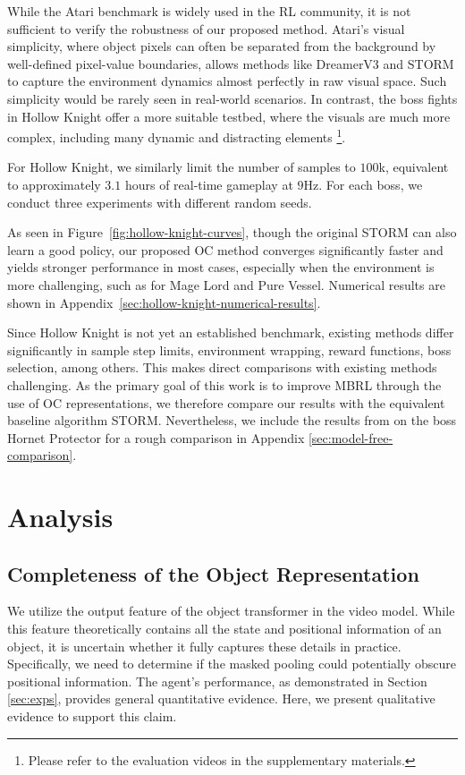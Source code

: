 \documentclass{article} %
\begin{document}
While the Atari benchmark is widely used in the RL community, it is not sufficient to verify the robustness of our proposed method.
Atari's visual simplicity, where object pixels can often be separated from the background by well-defined pixel-value boundaries, allows methods like DreamerV3 and STORM to capture the environment dynamics almost perfectly in raw visual space.
Such simplicity would be rarely seen in real-world scenarios.
In contrast, the boss fights in Hollow Knight offer a more suitable testbed, where the visuals are much more complex, including many dynamic and distracting elements \footnote{Please refer to the evaluation videos in the supplementary materials.}.

For Hollow Knight, we similarly limit the number of samples to $100$k, equivalent to approximately $3.1$ hours of real-time gameplay at $9$Hz. 
For each boss, we conduct three experiments with different random seeds.

As seen in Figure~\ref{fig:hollow-knight-curves}, though the original STORM can also learn a good policy, our proposed OC method converges significantly faster and yields stronger performance in most cases, especially when the environment is more challenging, such as for Mage Lord and Pure Vessel.
Numerical results are shown in Appendix~\ref{sec:hollow-knight-numerical-results}.

Since Hollow Knight is not yet an established benchmark, existing methods differ significantly in sample step limits, environment wrapping, reward functions, boss selection, among others.
This makes direct comparisons with existing methods challenging.
As the primary goal of this work is to improve MBRL through the use of OC representations, we therefore compare our results with the equivalent baseline algorithm STORM.
Nevertheless, we include the results from \citet{yang_seermerhollowknight_rl_2023} on the boss Hornet Protector for a rough comparison in Appendix \ref{sec:model-free-comparison}.


\section{Analysis} \label{sec:analysis}


\subsection{Completeness of the Object Representation} \label{sec:vector-decode-to-img}

We utilize the output feature of the object transformer in the video model. 
While this feature theoretically contains all the state and positional information of an object, it is uncertain whether it fully captures these details in practice. 
Specifically, we need to determine if the masked pooling could potentially obscure positional information.
The agent's performance, as demonstrated in Section \ref{sec:exps}, provides general quantitative evidence.
Here, we present qualitative evidence to support this claim.
\end{document}
